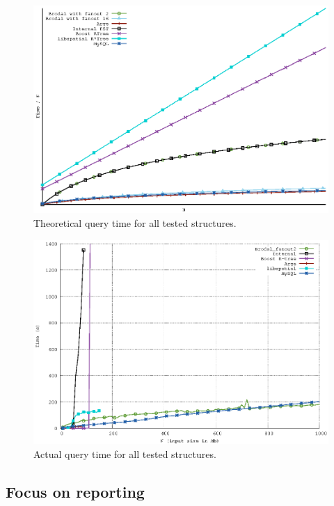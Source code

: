 \documentclass[twoside,11pt,openright]{report}
\begin{document}
\begin{figure}[htp!]
\includegraphics[width=\textwidth]{../plots/query_complexities/query_complexity}
\caption{Theoretical query time for all tested structures.}
\label{fig:theory_query_complexity}
\end{figure}

\begin{figure}[htp!]
\includegraphics[width=\textwidth]{../src/experiments/query_experiment_results/final2/time}
\caption{Actual query time for all tested structures.}
\label{fig:result_query_search_complexity}
\end{figure}

\clearpage

\subsection{Focus on reporting}
\end{document}
